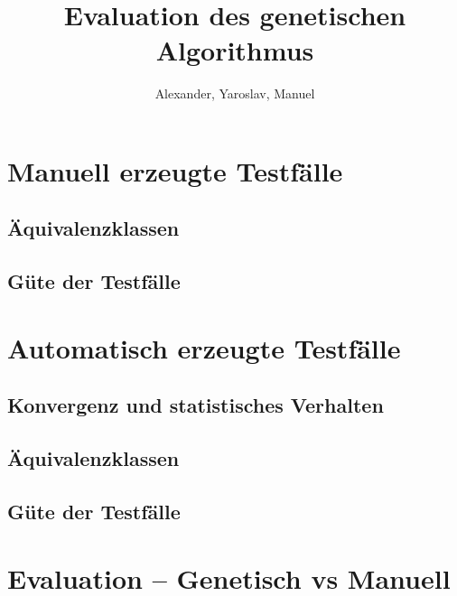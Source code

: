 \documentclass[12pt,a4paper]{scrartcl}
\author{Alexander, Yaroslav, Manuel}
\title{Evaluation des genetischen Algorithmus}
\begin{document}
\maketitle
\tableofcontents

\section{Manuell erzeugte Testfälle}
\subsection{Äquivalenzklassen}
\subsection{Güte der Testfälle}

\section{Automatisch erzeugte Testfälle}
\subsection{Konvergenz und statistisches Verhalten}
\subsection{Äquivalenzklassen}
\subsection{Güte der Testfälle}

\section{Evaluation -- Genetisch vs Manuell}
\end{document}
